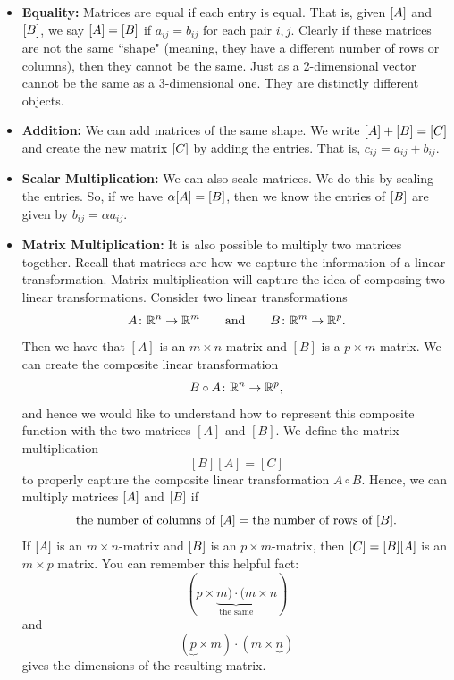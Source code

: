         \begin{itemize}
            \item \textbf{Equality:} Matrices are equal if each entry is equal. That is, given $[A]$ and $[B]$, we say $[A]=[B]$ if $a_{ij}=b_{ij}$ for each pair $i,j$.  Clearly if these matrices are not the same ``shape" (meaning, they have a different number of rows or columns), then they cannot be the same.  Just as a 2-dimensional vector cannot be the same as a 3-dimensional one.  They are distinctly different objects.
            
            \item \textbf{Addition:} We can add matrices of the same shape.  We write $[A]+[B]=[C]$ and create the new matrix $[C]$ by adding the entries.  That is, $c_{ij}=a_{ij}+b_{ij}$.  
            
            \item \textbf{Scalar Multiplication:} We can also scale matrices.  We do this by scaling the entries.  So, if we have $\alpha [A]=[B]$, then we know the entries of $[B]$ are given by $b_{ij}=\alpha a_{ij}$.
            
            \item \textbf{Matrix Multiplication:} It is also possible to multiply two matrices together.  Recall that matrices are how we capture the information of a linear transformation. Matrix multiplication will capture the idea of composing two linear transformations. Consider two linear transformations
            \[
            A \colon \mathbb{R}^n \to \mathbb{R}^m \qquad \textrm{and} \qquad B \colon \mathbb{R}^m \to \mathbb{R}^p.
            \]
            Then we have that $[A]$ is an $m\times n$-matrix and $[B]$ is a $p\times m$ matrix.  We can create the composite linear transformation 
            \[
            B \circ A \colon \mathbb{R}^n \to \mathbb{R}^p,
            \]
            and hence we would like to understand how to represent this composite function with the two matrices $[A]$ and $[B]$. We define the matrix multiplication
            \[
            [B][A]=[C]
            \]
            to properly capture the composite linear transformation $A\circ B$. Hence, we can multiply matrices $[A]$ and $[B]$ if 
            \[
            \textrm{the number of columns of $[A]$}=\textrm{the number of rows of $[B]$}.
            \]
            If $[A]$ is an $m\times n$-matrix and $[B]$ is an $p\times m$-matrix, then $[C]=[B] [A]$ is an $m\times p$ matrix.  You can remember this helpful fact:
            \[
            (p\times \underbrace{m)\cdot (m}_{\textrm{the same}}\times n)
            \]
            and
            \[
            (\underbrace{p}\times m)\cdot (m\times \underbrace{n})
            \]      
            gives the dimensions of the resulting matrix.
            

\end{itemize}
